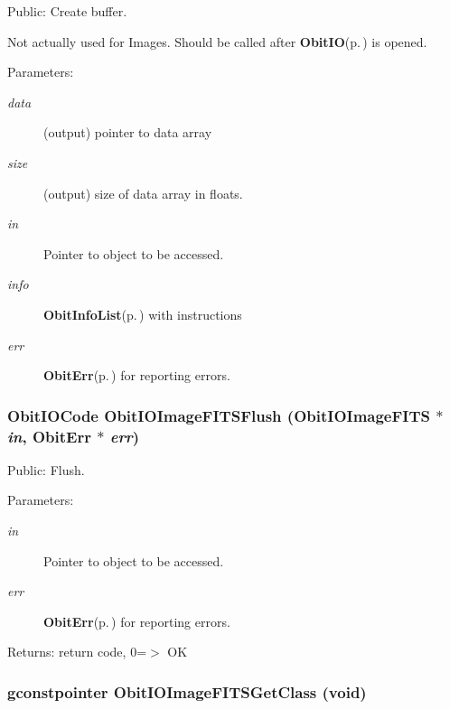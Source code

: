 Public: Create buffer. 

Not actually used for Images. Should be called after {\bf Obit\-IO}{\rm (p.\,\pageref{structObitIO})} is opened. \begin{Desc}
\item[Parameters:]
\begin{description}
\item[{\em data}](output) pointer to data array \item[{\em size}](output) size of data array in floats. \item[{\em in}]Pointer to object to be accessed. \item[{\em info}]{\bf Obit\-Info\-List}{\rm (p.\,\pageref{structObitInfoList})} with instructions \item[{\em err}]{\bf Obit\-Err}{\rm (p.\,\pageref{structObitErr})} for reporting errors. \end{description}
\end{Desc}
\subsubsection{\setlength{\rightskip}{0pt plus 5cm}Obit\-IOCode Obit\-IOImage\-FITSFlush ({\bf Obit\-IOImage\-FITS} $\ast$ {\em in}, {\bf Obit\-Err} $\ast$ {\em err})}\label{ObitIOImageFITS_8h_a16}


Public: Flush. 

\begin{Desc}
\item[Parameters:]
\begin{description}
\item[{\em in}]Pointer to object to be accessed. \item[{\em err}]{\bf Obit\-Err}{\rm (p.\,\pageref{structObitErr})} for reporting errors. \end{description}
\end{Desc}
\begin{Desc}
\item[Returns:]return code, 0=$>$ OK \end{Desc}
\subsubsection{\setlength{\rightskip}{0pt plus 5cm}gconstpointer Obit\-IOImage\-FITSGet\-Class (void)}\label{ObitIOImageFITS_8h_a5}


